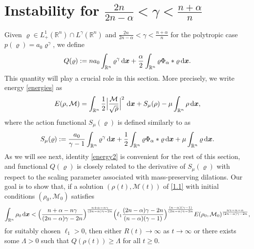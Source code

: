 \documentclass[reqno,11pt]{amsart}
\numberwithin{equation}{section}
\newcommand{\R}{\mathbb{R}}
\theoremstyle{definition}
\def\dd{{\, \rm d}}
\begin{document}
\medskip
\section{Instability for $\frac{2n}{2n - \alpha} < \gamma < \frac{n + \alpha}{n}$}\label{instability}

Given $\varrho \in L^1_+(\R^n) \cap L^\gamma(\mathbb{R}^n)$  
and 
$\frac{2n}{2n - \alpha} < \gamma < \frac{n + \alpha}{n}$
for the polytropic case $p(\varrho) = a_0 \varrho^\gamma$, we define
\begin{equation*}
Q(\varrho) := n a_0 \int_{\mathbb{R}^n} \varrho^\gamma \dd \boldsymbol{x} + \frac{\alpha}{2} \int_{\mathbb{R}^n} \varrho \Phi_\alpha * \varrho \dd \boldsymbol{x}.
\end{equation*}
This quantity will play a crucial role in this section.
More precisely, we write energy \eqref{energies} as
\begin{equation}\label{energy2}
 E(\rho,\mathcal{M}) = \int_{\mathbb{R}^n} \frac12 
  \Big |\frac{\mathcal{M}}{\sqrt{\rho}} \Big|^2\,\dd \boldsymbol{x}
  +S_\mu(\rho)- \mu \int_{\mathbb{R}^n} \rho \dd \boldsymbol{x},
\end{equation}
where the action functional $S_\mu(\varrho)$ is defined similarly to \cite{Cheng_2025} as
\[
S_\mu(\varrho) := \frac{a_0}{\gamma - 1} \int_{\mathbb{R}^n} \varrho^\gamma \dd \boldsymbol{x} 
+ \frac{1}{2} \int_{\mathbb{R}^n} \varrho \Phi_\alpha * \varrho \dd \boldsymbol{x} 
+ \mu \int_{\mathbb{R}^n} \varrho \dd \boldsymbol{x}.
\]
As we will see next, identity \eqref{energy2} is convenient for the rest of this section, 
and functional $Q(\varrho)$ is closely related to the derivative of $S_\mu(\varrho)$ 
with respect to the scaling parameter associated with mass-preserving dilations. 
Our goal is to show that, if a solution $(\rho(t),\mathcal{M}(t))$ of \eqref{1.1} 
with initial conditions $(\rho_0,\mathcal{M}_0)$ satisfies
\[
 \int_{\mathbb{R}^n} \rho_0 \dd \boldsymbol{x} < \Big ( \frac{n + \alpha - n\gamma}{(2n-\alpha)\gamma - 2n} \Big )^\frac{n + \alpha - n\gamma}{(2n-\alpha)\gamma - 2n} \Big ( \ell_1 \frac{(2n-\alpha)\gamma - 2n}{(n - \alpha)(\gamma - 1)} \Big )^\frac{(n - \alpha)(\gamma - 1)}{(2n-\alpha)\gamma - 2n} E(\rho_0,\mathcal{M}_0)^\frac{n\gamma - n - \alpha}{(2n - \alpha)\gamma - 2n},
\]
for suitably chosen $\ell_1>0$, then either $R(t) \to \infty$ as $t \to \infty$ or there exists 
some $\Lambda > 0$ such that $Q(\rho(t)) \geq \Lambda$ for all $t \geq 0$. 
\end{document}
